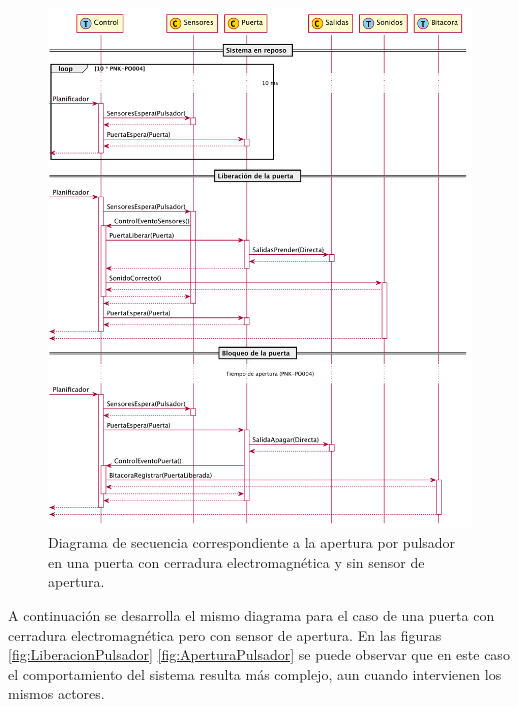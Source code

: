 \begin{figure}[H]
	\centering
	\includegraphics[width=\textwidth]{Figures/PNK-DS001.pdf}
	\caption[Apertura por pulsador con cerradura electromagnética y sin sensor]{Diagrama de secuencia correspondiente a la apertura por pulsador en una puerta con cerradura electromagnética y sin sensor de apertura.}
	\label{fig:AperturaSinSensor}
\end{figure}

\FloatBarrier

A continuación se desarrolla el mismo diagrama para el caso de una puerta con cerradura electromagnética pero con sensor de apertura. En las figuras \ref{fig:LiberacionPulsador} \ref{fig:AperturaPulsador} se puede observar que en este caso el comportamiento del sistema resulta más complejo, aun cuando intervienen los mismos actores.

